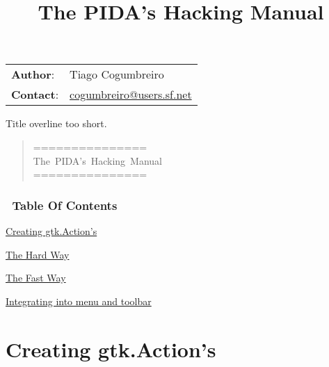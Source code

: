 \documentclass[10pt,a4paper,english]{article}
\title{The PIDA's Hacking Manual}
\author{}
\date{}
\newlength{\docinfowidth}
\newlength{\locallinewidth}
\begin{document}
\maketitle

\begin{center}
\begin{tabularx}{\docinfowidth}{lX}
\textbf{Author}: &
	Tiago Cogumbreiro \\
\textbf{Contact}: &
	\href{mailto:cogumbreiro@users.sf.net}{cogumbreiro@users.sf.net} \\
\end{tabularx}
\end{center}

\setlength{\locallinewidth}{\linewidth}

Title overline too short.
\begin{quote}{\ttfamily \raggedright \noindent
===============~\\
The~PIDA's~Hacking~Manual~\\
===============
}\end{quote}

\hypertarget{table-of-contents}{}
\subsubsection*{~\hfill Table Of Contents\hfill ~}
\begin{list}{}{}
\item {} \href{\#creating-gtk-action-s}{Creating gtk.Action's}
\begin{list}{}{}
\item {} \href{\#the-hard-way}{The Hard Way}

\item {} \href{\#the-fast-way}{The Fast Way}

\end{list}

\item {} \href{\#integrating-into-menu-and-toolbar}{Integrating into menu and toolbar}

\end{list}




\hypertarget{creating-gtk-action-s}{}
\section*{Creating gtk.Action's}
\end{document}
